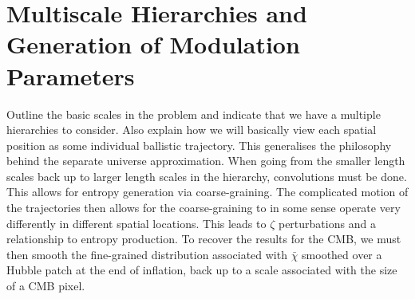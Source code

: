 \section{Multiscale Hierarchies and Generation of Modulation Parameters}
Outline the basic scales in the problem and indicate that we have a multiple hierarchies to consider.  Also explain how we will basically view each spatial position as some individual ballistic trajectory.  This generalises the philosophy behind the separate universe approximation.  When going from the smaller length scales back up to larger length scales in the hierarchy, convolutions must be done.  This allows for entropy generation via coarse-graining.  The complicated motion of the trajectories then allows for the coarse-graining to in some sense operate very differently in different spatial locations.  This leads to $\zeta$ perturbations and a relationship to entropy production.  To recover the results for the CMB, we must then smooth the fine-grained distribution associated with $\bar{\chi}$ smoothed over a Hubble patch at the end of inflation, back up to a scale associated with the size of a CMB pixel.

